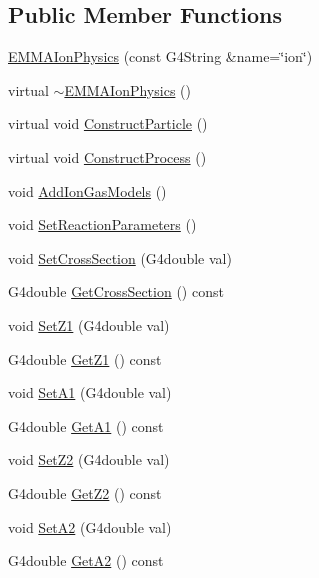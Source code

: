 \subsection*{Public Member Functions}
\begin{DoxyCompactItemize}
\item 
\hyperlink{classEMMAIonPhysics_a40c40de5ebabb9252b69d0dfe5a215f8}{E\+M\+M\+A\+Ion\+Physics} (const G4\+String \&name=\char`\"{}ion\char`\"{})
\item 
virtual \hyperlink{classEMMAIonPhysics_a9ca45889cb9486b84b35843ffa4958d9}{$\sim$\+E\+M\+M\+A\+Ion\+Physics} ()
\item 
virtual void \hyperlink{classEMMAIonPhysics_a2645db403cd4d1823024336a059b50e8}{Construct\+Particle} ()
\item 
virtual void \hyperlink{classEMMAIonPhysics_a2dc6a25dd215b9d604c313e47cdecb36}{Construct\+Process} ()
\item 
void \hyperlink{classEMMAIonPhysics_a0bb62e529a70d49fefd583ba31db1ed8}{Add\+Ion\+Gas\+Models} ()
\item 
void \hyperlink{classEMMAIonPhysics_aaddc18739c8d93547d851738e592a6b3}{Set\+Reaction\+Parameters} ()
\item 
void \hyperlink{classEMMAIonPhysics_a529e3e29ce819cb699180a6eb4d9a1bd}{Set\+Cross\+Section} (G4double val)
\item 
G4double \hyperlink{classEMMAIonPhysics_a38f5f9f9598c5827868dbfd221d35574}{Get\+Cross\+Section} () const 
\item 
void \hyperlink{classEMMAIonPhysics_a7c46375f17da96484c99652079dd08c8}{Set\+Z1} (G4double val)
\item 
G4double \hyperlink{classEMMAIonPhysics_a734a43dc9e13eb27b926a72fcedbe689}{Get\+Z1} () const 
\item 
void \hyperlink{classEMMAIonPhysics_a82a1f463c5b4e732a7bbe3e7501e85a6}{Set\+A1} (G4double val)
\item 
G4double \hyperlink{classEMMAIonPhysics_a7070d56d8592778be0a57e03e25bb41e}{Get\+A1} () const 
\item 
void \hyperlink{classEMMAIonPhysics_a7503ce3dbca012140403a6c27e681a0a}{Set\+Z2} (G4double val)
\item 
G4double \hyperlink{classEMMAIonPhysics_a7368f0e94de3717c1c3658370b3634b7}{Get\+Z2} () const 
\item 
void \hyperlink{classEMMAIonPhysics_a41139204e32c108983f66271b193c861}{Set\+A2} (G4double val)
\item 
G4double \hyperlink{classEMMAIonPhysics_aa40845e07a5082634ca5f22524c5eb18}{Get\+A2} () const 

\end{DoxyCompactItemize}
